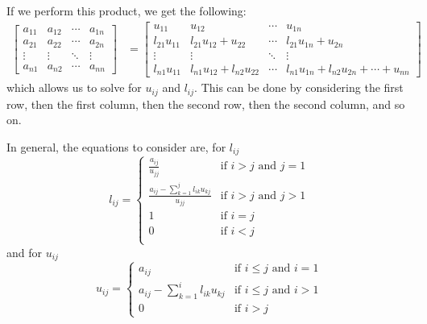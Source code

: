 \documentclass{article}
\begin{document}
If we perform this product, we get the following:
\begin{align*}
    \begin{bmatrix*}
        a_{11} & a_{12} & \cdots & a_{1n} \\
        a_{21} & a_{22} & \cdots & a_{2n} \\
        \vdots & \vdots & \ddots & \vdots \\
        a_{n1} & a_{n2} & \cdots & a_{nn}
    \end{bmatrix*} & = \begin{bmatrix*}
                           u_{11}        & u_{12} & \cdots & u_{1n} \\
                           l_{21} u_{11} & l_{21} u_{12} + u_{22} & \cdots & l_{21} u_{1n} + u_{2n} \\
                           \vdots        & \vdots & \ddots & \vdots \\
                           l_{n1} u_{11} & l_{n1} u_{12} + l_{n2} u_{22} & \cdots & l_{n1} u_{1n} + l_{n2} u_{2n} + \cdots + u_{nn}
                       \end{bmatrix*}
\end{align*}
which allows us to solve for \(u_{ij}\) and \(l_{ij}\). This can be done by
considering the first row, then the first column, then the second row, then the second column, and so on.

In general, the equations to consider are, for \(l_{ij}\)
\begin{equation*}
    l_{ij} = \begin{cases}
        \frac{a_{ij}}{u_{jj}}                                & \text{if \(i > j\) and \(j = 1\)} \\
        \frac{a_{ij} - \sum_{k = 1}^j l_{ik} u_{kj}}{u_{jj}} & \text{if \(i > j\) and \(j > 1\)} \\
        1                                                    & \text{if \(i = j\)}               \\
        0                                                    & \text{if \(i < j\)}               \\
    \end{cases}
\end{equation*}
and for \(u_{ij}\)
\begin{equation*}
    u_{ij} = \begin{cases}
        a_{ij}                                & \text{if \(i \leq j\) and \(i = 1\)} \\
        a_{ij} - \sum_{k = 1}^i l_{ik} u_{kj} & \text{if \(i \leq j\) and \(i > 1\)} \\
        0                                     & \text{if \(i > j\)}
    \end{cases}
\end{equation*}
\end{document}
